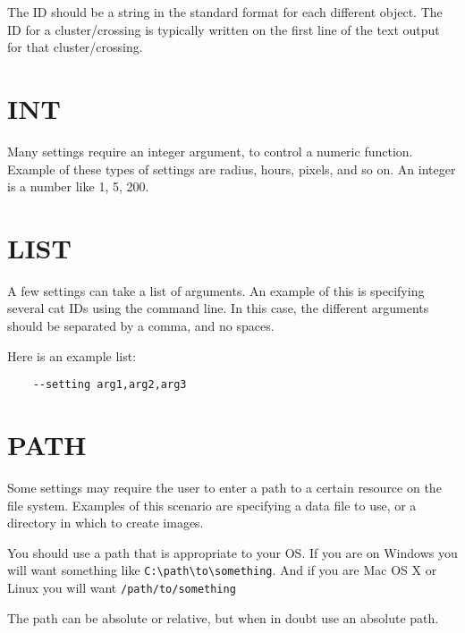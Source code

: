 The ID should be a string in the standard format for each different
object. The ID for a cluster/crossing is typically written on
the first line of the text output for that cluster/crossing.

\section{INT}
\hypertarget{argument-type-int}{}

Many settings require an integer argument, to control a numeric
function. Example of these types of settings are radius, hours,
pixels, and so on. An integer is a number like 1, 5, 200.

\section{LIST}
\hypertarget{argument-type-list}{}

A few settings can take a list of arguments. An example of this is
specifying several cat IDs using the command line. In this case,
the different arguments should be separated by a comma, and no
spaces.

Here is an example list:

\begin{verbatim}
    --setting arg1,arg2,arg3
\end{verbatim}

\section{PATH}
\hypertarget{argument-type-path}{}

Some settings may require the user to enter a path to a certain
resource on the file system. Examples of this scenario are specifying
a data file to use, or a directory in which to create images.

You should use a path that is appropriate to your OS. If you are
on Windows you will want something like \texttt{C:\textbackslash{}path\textbackslash{}to\textbackslash{}something}.
And if you are Mac OS X or Linux you will want \texttt{/path/to/something}

The path can be absolute or relative, but when in doubt use an absolute
path.
